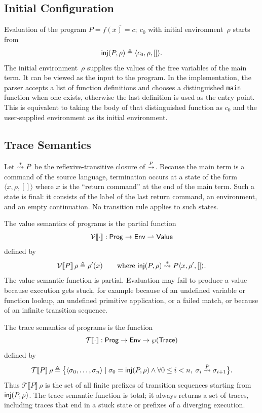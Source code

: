 \documentclass[11pt]{article}
\begin{document}
\subsection{Initial Configuration}
Evaluation of the program $P = \overline{f(\overline{x}) = c;}\ c_0$ with initial environment~$\rho$ starts from
\[
\textsf{inj}(P, \rho) \triangleq \langle c_0, \rho, [] \rangle.
\]
The initial environment~$\rho$ supplies the values of the free variables of the main term.
It can be viewed as the input to the program.
In the implementation, the parser accepts a list of function definitions and chooses a distinguished
\texttt{main} function when one exists, otherwise the last definition is used as the entry point.
This is equivalent to taking the body of that distinguished function as \(c_0\) and the user-supplied
environment as its initial environment.

\subsection{Trace Semantics}
Let $\overset{*}{\rightsquigarrow}{P}$ be the reflexive-transitive closure of $\overset{P}{\rightsquigarrow}$.
Because the main term is a command of the source language, termination occurs at a state of the form $\langle x, \rho, [] \rangle$ where $x$ is the ``return command'' at the end of the main term.
Such a state is final: it consists of the label of the last return command, an environment, and an empty continuation.
No transition rule applies to such states.
 
The value semantics of programs is the partial function
\[
\mathcal{V}\llbracket \cdot \rrbracket : \textsf{Prog} \to \textsf{Env} \rightharpoonup \textsf{Value}
\]
defined by
\[
\mathcal{V}\llbracket P \rrbracket\, \rho \triangleq \rho'(x)
\qquad\text{where } \textsf{inj}(P, \rho)\overset{*}{\rightsquigarrow}{P} \langle x, \rho', [] \rangle.
\]
The value semantic function is partial.
Evaluation may fail to produce a value because execution gets stuck, for example because of an undefined variable or function lookup, an undefined primitive application, or a failed match, or because of an infinite transition sequence.
 
The trace semantics of programs is the function
\[
\mathcal{T}\llbracket \cdot \rrbracket : \textsf{Prog} \to \textsf{Env} \to \wp(\textsf{Trace})
\]
defined by
\[
\mathcal{T}\llbracket P \rrbracket\, \rho
\triangleq
\bigl\{
\langle \sigma_0,\dots,\sigma_n \rangle
\mid
\sigma_0 = \textsf{inj}(P, \rho)
\land
\forall 0 \le i < n,\; \sigma_i \overset{P}{\rightsquigarrow} \sigma_{i+1}
\bigr\}.
\]
Thus $\mathcal{T}\llbracket P \rrbracket\, \rho$ is the set of all finite prefixes of transition sequences starting from $\textsf{inj}(P,\rho)$.
The trace semantic function is total; it always returns a set of traces, including traces that end in a stuck state or prefixes of a diverging execution.
\end{document}
